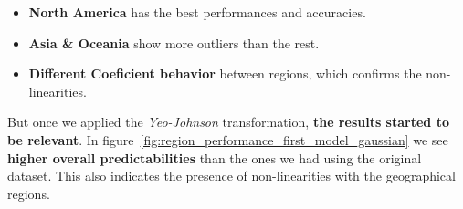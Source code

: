 \documentclass[11pt,english,a4paper,hidelinks]{book}
\begin{document}
\begin{itemize}
    \item \textbf{North America} has the best performances and accuracies.
    \item \textbf{Asia \& Oceania} show more outliers than the rest.
    \item \textbf{Different Coeficient behavior} between regions, which confirms the non-linearities.
\end{itemize}

\noindent But once we applied the \textit{Yeo-Johnson} transformation, \textbf{the results started to be relevant}. In figure~\ref{fig:region_performance_first_model_gaussian} we see \textbf{higher overall predictabilities}  than the ones we had using the original dataset. This also indicates the presence of non-linearities with the geographical regions.
\end{document}
